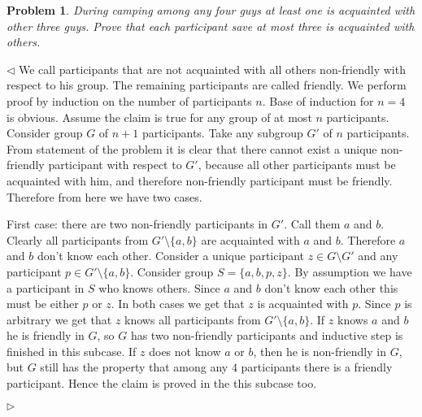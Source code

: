 \documentclass[12pt]{article}
\newtheorem{problem}{Problem}[subsection]
\newenvironment{solution}{\par $\triangleleft$}{$\triangleright$}
\begin{document}
\begin{problem} During camping among any four guys at least one is acquainted
with other three guys. Prove that each participant save at most three is
acquainted with others.
\end{problem}
\begin{solution} We call participants that are not acquainted with all others
    non-friendly with respect to his group. The remaining participants are
    called friendly. We perform proof by induction on the number of participants
    $n$. Base of induction for $n=4$ is obvious. Assume the claim is true for
    any group of at most $n$ participants. Consider group $G$ of $n+1$
    participants. Take any subgroup $G'$ of $n$ participants. From statement of
    the problem it is clear that there cannot exist a unique non-friendly
    participant with respect to $G'$, because all other participants must be
    acquainted with him, and therefore non-friendly participant must be
    friendly. Therefore from here we have two cases.

    First case: there are two non-friendly participants in $G'$. Call them $a$
    and $b$. Clearly all participants from $G'\setminus \{a,b\}$ are acquainted
    with $a$ and $b$. Therefore $a$ and $b$ don't know each other. Consider a
    unique participant $z\in G\setminus G'$ and any participant $p\in
        G'\setminus \{a,b\}$. Consider group $S=\{a,b,p,z\}$. By assumption we have
    a participant in $S$ who knows others. Since $a$ and $b$ don't know each
    other this must be either $p$ or $z$. In both cases we get that $z$ is
    acquainted with $p$. Since $p$ is arbitrary we get that $z$ knows all
    participants from $G'\setminus \{a,b\}$. If $z$ knows $a$ and $b$ he is
    friendly in $G$, so $G$ has two non-friendly participants and inductive step
    is finished in this subcase. If $z$ does not know $a$ or $b$, then he is
    non-friendly in $G$, but $G$ still has the property that among any $4$
    participants there is a friendly participant. Hence the claim is proved in
    the this subcase too.


\end{solution}
\end{document}
